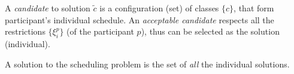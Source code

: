 A \emph{candidate} to solution $\tilde{c}$ is a configuration (set) of classes
$\{c\}$, that form participant's individual schedule. An \emph{acceptable candidate}
respects all the restrictions $\{\xi^p_i\}$ (of the participant $p$),
thus can be selected as the solution (individual).

\bigskip

\noindent
A solution to the scheduling problem is the set of \emph{all} the individual solutions.
